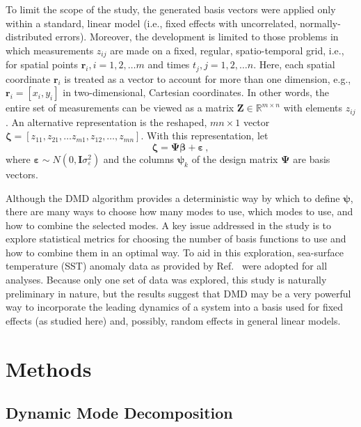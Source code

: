 \documentclass[review,number,sort&compress,12pt]{elsarticle}
\begin{document}
To limit the scope of the study, the generated basis vectors were applied only within a standard, linear model (i.e., fixed effects with uncorrelated, normally-distributed errors). Moreover, the development is limited to those problems in which measurements $z_{ij}$ are made on a fixed, regular, spatio-temporal grid, i.e., for spatial points $\mathbf{r}_i, i = 1, 2, \ldots m$ and times $t_j, j = 1, 2, \ldots n$. 
Here, each spatial coordinate $\mathbf{r}_i$ is treated as a vector to account for more than one dimension, e.g., $\mathbf{r}_i = [x_i, y_i]$ in two-dimensional, Cartesian coordinates.
In other words, the entire set of measurements can be viewed as a matrix $\mathbf{Z} \in \mathbb{R}^{m\times n}$ with elements $z_{ij}$. 
An alternative representation is the reshaped, $mn \times 1$ vector $\boldsymbol{\zeta} = [z_{11}, z_{21}, \ldots z_{m1}, z_{12}, \ldots, z_{mn}]$.
With this representation, let
\begin{equation}
 \boldsymbol{\zeta} = \boldsymbol{\Psi}\boldsymbol{\beta} + \boldsymbol{\varepsilon} \, ,
 \label{eq:linmodel}
\end{equation}
where $\boldsymbol{\varepsilon} \sim N(0, \mathbf{I}\sigma^2_{\varepsilon})$ and the columns $\boldsymbol{\psi}_k$ of the design matrix $\boldsymbol{\Psi}$ are basis vectors.

Although the DMD algorithm provides a deterministic way by which to define $\mathbf{\psi}$, there are many ways to choose how many modes to use, which modes to use, and how to combine the selected modes.
A key issue addressed in the study is to explore statistical metrics for choosing the number of basis functions to use and how to combine them in an optimal way.
To aid in this exploration, sea-surface temperature (SST) anomaly data as provided by Ref.~\cite{wikle2019sts} were adopted for all analyses.
Because only one set of data was explored, this study is naturally preliminary in nature, but the results suggest that DMD may be a very powerful way to incorporate the leading dynamics of a system into a basis used for fixed effects (as studied here) and, possibly, random effects in general linear models.


\section{Methods}
\label{sec:methods}

\subsection{Dynamic Mode Decomposition} 
\end{document}
